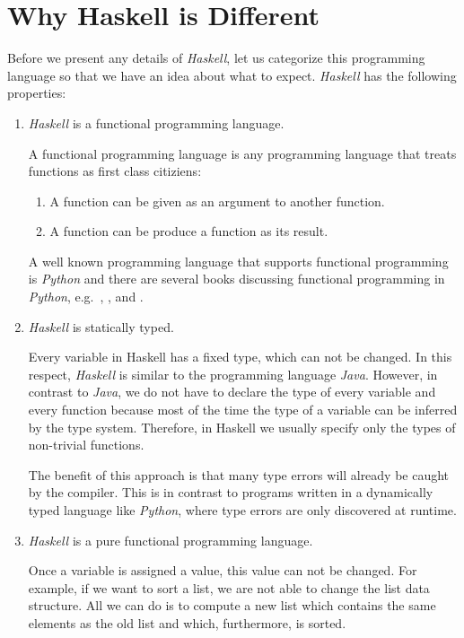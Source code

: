 \documentclass[11pt]{report}
\newcommand{\blue}[1]{{\color{blue}#1}}
\begin{document}
\section{Why Haskell is Different}
Before we present any details of \textsl{Haskell}, let us categorize this programming language so that we have
an idea about what to expect.  \textsl{Haskell} has the following properties:
\begin{enumerate}
\item \textsl{Haskell} is a \blue{functional programming language}.

  A functional programming language is any programming language that treats functions as
  \blue{first class citiziens}:
  \begin{enumerate}
  \item A function can be given as an argument to another function.
  \item A function can be produce a function as its result.
  \end{enumerate}
  A well known programming language that supports functional programming is \textsl{Python} and there are
  several books discussing functional programming in \textsl{Python}, e.g.~\cite{lott:2022}, \cite{mertz:2015},
  and \cite{reid:2023}.  

\item \textsl{Haskell} is \blue{statically typed}.

  Every variable in Haskell has a fixed type, which can not be changed.  In this respect, \textsl{Haskell} is
  similar to the programming language \textsl{Java}.  However, in contrast to \textsl{Java}, we do not have to
  declare the type of every variable and every function because most of the time the type of a variable can be
  \blue{inferred} by the type system.  Therefore, in Haskell we usually specify only the types of non-trivial
  functions.

  The benefit of this approach is that many type errors will already be caught by the compiler.  This is in
  contrast to programs written in a dynamically typed language like \textsl{Python}, where type errors are only
  discovered at runtime.

\item \textsl{Haskell} is a \blue{pure} functional programming language.

  Once a variable is assigned a value, this value can not be changed.  For example, if we want to sort a list,
  we are not able to change the list data structure.  All we can do is to compute a new list which contains the
  same elements as the old list and which, furthermore, is sorted.


\end{enumerate}
\end{document}
